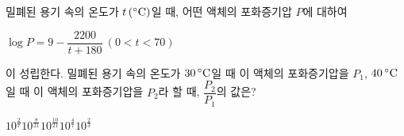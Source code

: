 밀폐된 용기 속의 온도가 $t\mkern3mu (^\circ\mathrm{C})$일 때, 어떤 액체의 포화증기압 $P$에 대하여 \par\smallskip\noindent\hspace*{1.5em}$\log P=9-\dfrac{2200}{t+180}\ (0<t<70)$\par\smallskip\noindent 이 성립한다. 밀폐된 용기 속의 온도가 $30\mkern3mu ^\circ\mathrm{C}$일 때 이 액체의 포화증기압을 $P_1$, $40\mkern3mu ^\circ\mathrm{C}$일 때 이 액체의 포화증기압을 $P_2$라 할 때, $\dfrac{P_2}{P_1}$의 값은?
\begin{choices32}{$10^{\frac{2}{7}}$}{$10^{\frac{8}{21}}$}{$10^{\frac{10}{21}}$}{$10^{\frac{4}{7}}$}{$10^{\frac{2}{3}}$}\end{choices32}
